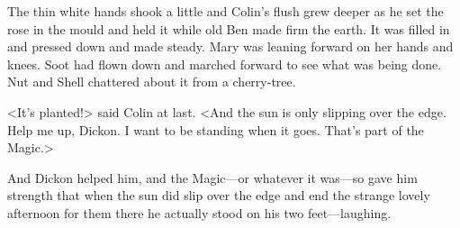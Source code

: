 The thin white hands shook a little and Colin's flush grew deeper as he set the rose in the mould and held it while old Ben made firm the earth. It was filled in and pressed down and made steady. Mary was leaning forward on her hands and knees. Soot had flown down and marched forward to see what was being done. Nut and Shell chattered about it from a cherry-tree.

<It's planted!> said Colin at last. <And the sun is only slipping over the edge. Help me up, Dickon. I want to be standing when it goes. That's part of the Magic.>

And Dickon helped him, and the Magic—or whatever it was—so gave him strength that when the sun did slip over the edge and end the strange lovely afternoon for them there he actually stood on his two feet—laughing.
